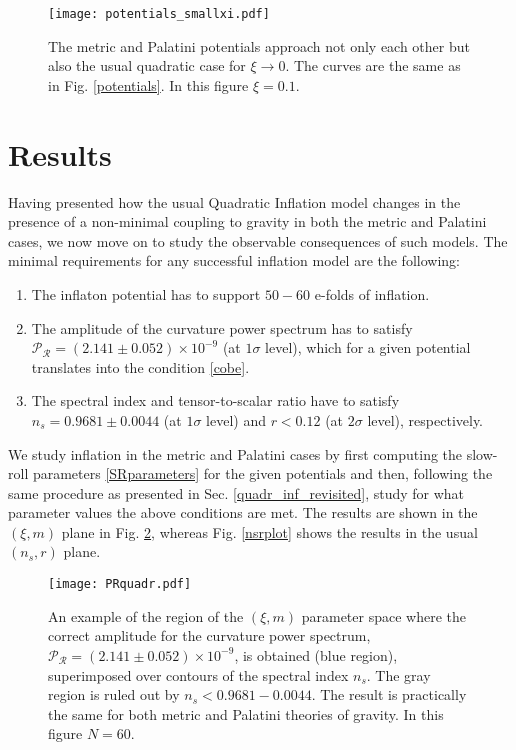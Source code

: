 \documentclass[11pt,a4paper]{article}
\begin{document}
\begin{figure}
\begin{center}
\texttt{[image: potentials\_smallxi.pdf]}
\caption{The metric and Palatini potentials approach not only each other but also the usual quadratic case for $\xi \to 0$. The curves are the same as in Fig. \ref{potentials}. In this figure $\xi=0.1$.}
\label{potentials_smallxi}
\end{center}
\end{figure}

\section{Results}
\label{results}

Having presented how the usual Quadratic Inflation model changes in the presence of a non-minimal coupling to gravity in both the metric and Palatini cases, we now move on to study the observable consequences of such models. The minimal requirements for any successful inflation model are the following: 
\begin{enumerate}
\item The inflaton potential has to support $50-60$ e-folds of inflation.
\item The amplitude of the curvature power spectrum has to satisfy $\mathcal{P}_{\mathcal{R}}=(2.141\pm 0.052)\times 10^{-9}$ (at $1\sigma$ level), which for a given potential translates into the condition \eqref{cobe}.
\item The spectral index and tensor-to-scalar ratio have to satisfy $n_s=0.9681\pm 0.0044$ (at $1\sigma$ level) and $r<0.12$ (at $2\sigma$ level), respectively.
\end{enumerate}
We study inflation in the metric and Palatini cases by first computing the slow-roll parameters \eqref{SRparameters} for the given potentials and then, following the same procedure as presented in Sec. \ref{quadr_inf_revisited}, study for what parameter values the above conditions are met. The results are shown in the $(\xi, m)$ plane in Fig. \ref{PRquadr}, whereas Fig. \ref{nsrplot} shows the results in the usual $(n_s,r)$ plane.

\begin{figure}
\begin{center}
\texttt{[image: PRquadr.pdf]}
\caption{An example of the region of the $(\xi, m)$ parameter space where the correct amplitude for the curvature power spectrum, $\mathcal{P}_{\mathcal{R}}=(2.141\pm 0.052)\times 10^{-9}$, is obtained (blue region), superimposed over contours of the spectral index $n_s$. The gray region is ruled out by $n_s<0.9681 - 0.0044$. The result is practically the same for both metric and Palatini theories of gravity. In this figure $N=60$.}
\label{PRquadr}
\end{center}
\end{figure}
\end{document}
